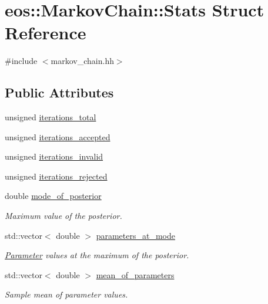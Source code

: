 \hypertarget{structeos_1_1MarkovChain_1_1Stats}{
\section{eos::MarkovChain::Stats Struct Reference}
\label{structeos_1_1MarkovChain_1_1Stats}
}


{\ttfamily \#include $<$markov\_\-chain.hh$>$}\subsection*{Public Attributes}
\begin{DoxyCompactItemize}
\item 
unsigned \hyperlink{structeos_1_1MarkovChain_1_1Stats_a0917e5acbc58e7b9fbe0c478b95e26ac}{iterations\_\-total}
\item 
unsigned \hyperlink{structeos_1_1MarkovChain_1_1Stats_a4a20f93d5d7f8a19ce9f59f3bb642563}{iterations\_\-accepted}
\item 
unsigned \hyperlink{structeos_1_1MarkovChain_1_1Stats_a42f68b2f84a5b2e3190529b9d8449e0e}{iterations\_\-invalid}
\item 
unsigned \hyperlink{structeos_1_1MarkovChain_1_1Stats_a61fc40a3cbb379e8ebc57b11eb388514}{iterations\_\-rejected}
\item 
double \hyperlink{structeos_1_1MarkovChain_1_1Stats_aead4abcd766affbdbb602d906b4938f6}{mode\_\-of\_\-posterior}
\begin{DoxyCompactList}\small\item\em Maximum value of the posterior. \item\end{DoxyCompactList}\item 
std::vector$<$ double $>$ \hyperlink{structeos_1_1MarkovChain_1_1Stats_a9000c8ee4f560120fcc5bec1c615e7b0}{parameters\_\-at\_\-mode}
\begin{DoxyCompactList}\small\item\em \hyperlink{classeos_1_1Parameter}{Parameter} values at the maximum of the posterior. \item\end{DoxyCompactList}\item 
std::vector$<$ double $>$ \hyperlink{structeos_1_1MarkovChain_1_1Stats_a43a0dbf5329e74fc9eef0cd7f5b28641}{mean\_\-of\_\-parameters}
\begin{DoxyCompactList}\small\item\em Sample mean of parameter values. \item\end{DoxyCompactList}\item 

\end{DoxyCompactItemize}
